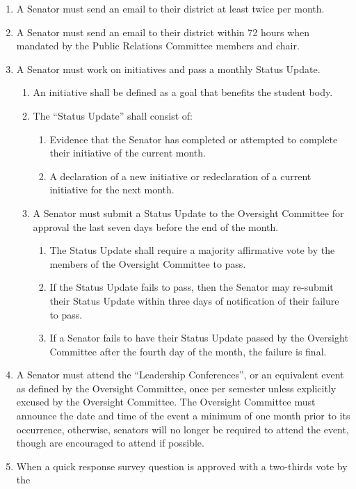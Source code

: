 \documentclass[12pt]{scrreprt}
\begin{document}
\begin{enumerate}
    \item A Senator must send an email to their district at least twice per month.
    \item A Senator must send an email to their district within 72 hours when mandated by the Public Relations Committee members and chair.
    \item A Senator must work on initiatives and pass a monthly Status Update.
    \begin{enumerate}
        \item An initiative shall be defined as a goal that benefits the student body.
        \item The “Status Update” shall consist of:
        \begin{enumerate}
            \item Evidence that the Senator has completed or attempted to complete their initiative of the current month.
            \item A declaration of a new initiative or redeclaration of a current initiative for the next month.
        \end{enumerate}
        \item A Senator must submit a Status Update to the Oversight Committee for approval the last seven days before the end of the month.
        \begin{enumerate}
            \item The Status Update shall require a majority affirmative vote by the members of the Oversight Committee to pass.
            \item If the Status Update fails to pass, then the Senator may re-submit their Status Update within three days of notification of their failure to pass.
            \item If a Senator fails to have their Status Update passed by the Oversight Committee after the fourth day of the month, the failure is final.
        \end{enumerate}
    \end{enumerate}
    \item A Senator must attend the “Leadership Conferences”, or an equivalent event as defined by
the Oversight Committee, once per semester unless explicitly excused by the Oversight
Committee. The Oversight Committee must announce the date and time of the event a
minimum of one month prior to its occurrence, otherwise, senators will no longer be required to
attend the event, though are encouraged to attend if possible.
    \item When a quick response survey question is approved with a two-thirds vote by the

\end{enumerate}
\end{document}
